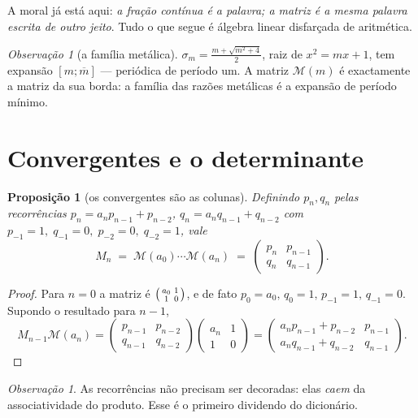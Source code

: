\documentclass[11pt,a4paper]{article}
\theoremstyle{plain}
\newtheorem{proposicao}[teorema]{Proposição}
\theoremstyle{definition}
\theoremstyle{remark}
\newtheorem{obs}[teorema]{Observação}
\newcommand{\Mat}[1]{\mathcal{M}(#1)}
\newcommand{\cf}[2]{[#1;#2]}
\begin{document}
A moral já está aqui: \emph{a fração contínua é a palavra; a matriz é a mesma palavra escrita
de outro jeito}. Tudo o que segue é álgebra linear disfarçada de aritmética.

\begin{obs}[a família metálica]\label{obs:metais}
$\sigma_m = \tfrac{m+\sqrt{m^2+4}}{2}$, raiz de $x^2 = mx+1$, tem expansão $\cf{m}{\overline{m}}$ ---
periódica de período um. A matriz $\Mat{m}$ é exactamente a matriz da sua borda: a família das
razões metálicas é a expansão de período mínimo.
\end{obs}

\section{Convergentes e o determinante}\label{sec:conv}

\begin{proposicao}[os convergentes são as colunas]\label{prop:conv}
Definindo $p_n,q_n$ pelas recorrências
$p_n = a_np_{n-1}+p_{n-2}$, $q_n = a_nq_{n-1}+q_{n-2}$ com
$p_{-1}=1,\;q_{-1}=0,\;p_{-2}=0,\;q_{-2}=1$, vale
\[
  M_n \;=\; \Mat{a_0}\cdots\Mat{a_n} \;=\;
  \begin{pmatrix} p_n & p_{n-1} \\ q_n & q_{n-1} \end{pmatrix}.
\]
\end{proposicao}

\begin{proof}
Para $n=0$ a matriz é $\begin{psmallmatrix} a_0&1\\1&0\end{psmallmatrix}$, e de fato
$p_0=a_0,\,q_0=1,\,p_{-1}=1,\,q_{-1}=0$. Supondo o resultado para $n-1$,
\[
  M_{n-1}\Mat{a_n}
  = \begin{pmatrix} p_{n-1} & p_{n-2} \\ q_{n-1} & q_{n-2}\end{pmatrix}
    \begin{pmatrix} a_n & 1 \\ 1 & 0 \end{pmatrix}
  = \begin{pmatrix} a_np_{n-1}+p_{n-2} & p_{n-1} \\ a_nq_{n-1}+q_{n-2} & q_{n-1}\end{pmatrix}.
\]
\end{proof}

\begin{obs}
As recorrências não precisam ser decoradas: elas \emph{caem} da associatividade do produto.
Esse é o primeiro dividendo do dicionário.
\end{obs}
\end{document}
